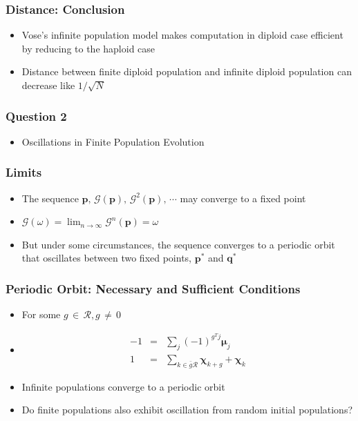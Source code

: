 \documentclass[aspectratio=169]{beamer}
\begin{document}
  \begin{frame}
    \frametitle{Distance: Conclusion}
    \begin{itemize}
      \item{Vose's infinite population model makes computation in diploid case efficient by reducing to the haploid case}  
      \item{Distance between finite diploid population and infinite diploid population can decrease like $1/\sqrt{N}$}
    \end{itemize}
  \end{frame}
  
  \begin{frame}
    \frametitle{Question 2}
    \begin{itemize}
      \item{Oscillations in Finite Population Evolution}      
    \end{itemize}
  \end{frame}
  
  \begin{frame}
    \frametitle{Limits}
    \begin{itemize}
      \item{The sequence $\bm{p}, \, \mathcal{G}(\bm{p}), \, {\mathcal{G}}^2(\bm{p}), \, \cdots$ may converge to a fixed point }  
      \item{$\mathcal{G}(\omega) = \lim_{n\to\infty} \mathcal{G}^n(\bm{p}) = \omega$}
      \item{But under some circumstances, the sequence converges to a periodic orbit that oscillates between two fixed points, $\bm{p}^\ast$ and $\bm{q}^\ast$}
    \end{itemize}
  \end{frame}
  
  \begin{frame}
    \frametitle{Periodic Orbit: Necessary and Sufficient Conditions}
    \begin{itemize}
      \item{For some $g \,\in\, \mathcal{R} , g \,\neq\, 0$}    
      \item{
      \begin{eqnarray*}
      -1 &=& \sum \limits_{j} (-1)^{g^T j} \bm{\mu}_j \\
      1 &=& \sum \limits_{k \in \bar{g}\mathcal{R}} \bm{\chi}_{k+g} + \bm{\chi}_k 
      \end{eqnarray*}
      }
      \item{Infinite populations converge to a periodic orbit }
      \item{Do finite populations also exhibit oscillation from random initial populations?}
    \end{itemize}
  \end{frame}  
  
\end{document}
